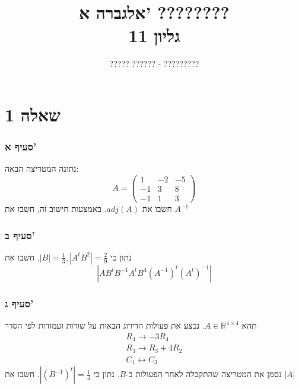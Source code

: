 \documentclass[12pt, titlepage]{article}
\title{אלגברה א' ???????? \\ גליון 11}
\author{????? ?????? - ?????????}
\begin{document}
\maketitle
\pagestyle{fancy}
\fancyhead{}
\part*{שאלה 1}
\section*{סעיף א'}
נתונה המטריצה הבאה:
\[
    A=\begin{pmatrix}
        1 & -2 & -5 \\
        -1 & 3 & 8 \\
        -1 & 1 & 3
    \end{pmatrix}
\]
חשבו את $adj\left(A\right)$. באמצעות חישוב זה, חשבו את $A^{-1}$
\section*{סעיף ב'}
נתון כי $\left|B\right|=\frac{1}{3}, \left|A^{t}B^{2}\right| = \frac{2}{9}$. חשבו את
\[
    \left|AB^{t}B^{-1}A^{t}B^{4}\left(A^{-1}\right)^{t}\left(A^{t}\right)^{-1}\right|
\]
\section*{סעיף ג'}
תהא $A\in\mathbb{R}^{4\times4}$. נבצע את פעולות הדירוג הבאות על שורות ועמודות לפי הסדר
\begin{gather*}
    R_4 \to -3R_4 \\
    R_3 \to R_3 + 4R_2 \\
    C_1 \leftrightarrow C_3
\end{gather*}
נסמן את המטריצה שהתקבלה לאחר הפעולות ב-$B$. נתון כי $\left|\left(B^{-1}\right)^{t}\right|=\frac{1}{4}$. חשבו את $\left|A\right|$
\newpage
\end{document}

